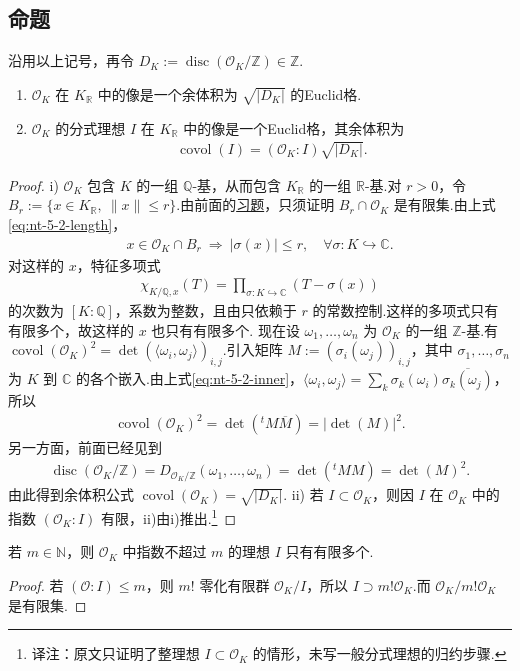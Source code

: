 \subsection{命题}\label{sec:nt-5-2-1}
沿用以上记号，再令 $D_K:=\operatorname{disc}(\mathcal O_K/\mathbb Z)\in\mathbb Z$.
\begin{enumerate}[label=\roman*)]
\item $\mathcal O_K$ 在 $K_{\mathbb R}$ 中的像是一个余体积为 $\sqrt{|D_K|}$ 的Euclid格.
\item $\mathcal O_K$ 的分式理想 $I$ 在 $K_{\mathbb R}$ 中的像是一个Euclid格，其余体积为
\begin{align*}
\operatorname{covol}(I)=(\mathcal O_K:I)\sqrt{|D_K|}.
\end{align*}
\end{enumerate}
\begin{proof}
\textup{i)} $\mathcal O_K$ 包含 $K$ 的一组 $\mathbb Q$-基，从而包含 $K_{\mathbb R}$ 的一组 $\mathbb R$-基.对 $r>0$，令 $B_r:=\{x\in K_{\mathbb R},\ \|x\|\le r\}$.由前面的\hyperref[ex:nt-5-1-lattice]{习题}，只须证明 $B_r\cap\mathcal O_K$ 是有限集.由上式\eqref{eq:nt-5-2-length}，
\begin{align*}
x\in\mathcal O_K\cap B_r\ \Longrightarrow\ |\sigma(x)|\le r,\quad\forall\sigma\colon K\hookrightarrow\mathbb C.
\end{align*}
对这样的 $x$，特征多项式
\begin{align*}
\chi_{K/\mathbb Q,x}(T)=\prod_{\sigma\colon K\hookrightarrow\mathbb C}(T-\sigma(x))
\end{align*}
的次数为 $[K:\mathbb Q]$，系数为整数，且由只依赖于 $r$ 的常数控制.这样的多项式只有有限多个，故这样的 $x$ 也只有有限多个.
现在设 $\omega_1,\ldots,\omega_n$ 为 $\mathcal O_K$ 的一组 $\mathbb Z$-基.有 $\operatorname{covol}(\mathcal O_K)^2=\det(\langle\omega_i,\omega_j\rangle)_{i,j}$.引入矩阵 $M:=(\sigma_i(\omega_j))_{i,j}$，其中 $\sigma_1,\ldots,\sigma_n$ 为 $K$ 到 $\mathbb C$ 的各个嵌入.由上式\eqref{eq:nt-5-2-inner}，$\langle\omega_i,\omega_j\rangle=\sum_k\sigma_k(\omega_i)\overline{\sigma_k(\omega_j)}$，所以
\begin{align*}
\operatorname{covol}(\mathcal O_K)^2=\det({}^tM\overline M)=|\det(M)|^2.
\end{align*}
另一方面，前面已经见到
\begin{align*}
\operatorname{disc}(\mathcal O_K/\mathbb Z)=D_{\mathcal O_K/\mathbb Z}(\omega_1,\ldots,\omega_n)=\det({}^tMM)=\det(M)^2.
\end{align*}
由此得到余体积公式 $\operatorname{covol}(\mathcal O_K)=\sqrt{|D_K|}$.
\textup{ii)} 若 $I\subset\mathcal O_K$，则因 $I$ 在 $\mathcal O_K$ 中的指数 $(\mathcal O_K:I)$ 有限，ii)由i)推出.\footnote{译注：原文只证明了整理想 $I\subset\mathcal O_K$ 的情形，未写一般分式理想的归约步骤.}
\end{proof}
\begin{lemma*}\label{lem:nt-5-2-bounded-index}
若 $m\in\mathbb N$，则 $\mathcal O_K$ 中指数不超过 $m$ 的理想 $I$ 只有有限多个.
\end{lemma*}
\begin{proof}
若 $(\mathcal O:I)\le m$，则 $m!$ 零化有限群 $\mathcal O_K/I$，所以 $I\supset m!\mathcal O_K$.而 $\mathcal O_K/m!\mathcal O_K$ 是有限集.
\end{proof}
